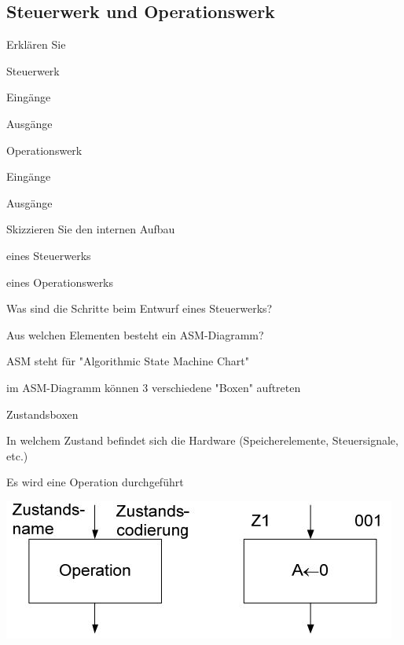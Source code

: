 \documentclass
[
  draft    = true,
  fontsize = 11pt,
  parskip  = half-,
  BCOR     = 0pt,
  DIV      = 11,
  ngerman,
  dvipsnames
]
{scrartcl}
\begin{document}
\subsection*{Steuerwerk und Operationswerk}
\begin{mytemize}
  \item Erklären Sie
        \begin{mytemize}
          \item Steuerwerk
                \begin{mytemize}
                  \item Eingänge
                  \item Ausgänge
                \end{mytemize}
          \item Operationswerk
                \begin{mytemize}
                  \item Eingänge
                  \item Ausgänge
                \end{mytemize}
        \end{mytemize}
  \item Skizzieren Sie den internen Aufbau
        \begin{mytemize}
          \item eines Steuerwerks
          \item eines Operationswerks
        \end{mytemize}
  \item Was sind die Schritte beim Entwurf eines Steuerwerks?
  \item Aus welchen Elementen besteht ein ASM-Diagramm?
	  \begin{karsten}
	  	\begin{mytemize}
	  		\item ASM steht für "Algorithmic State Machine Chart"
	  		\item im ASM-Diagramm können 3 verschiedene "Boxen" auftreten
	  		\begin{mytemize}
	  			\item Zustandsboxen
	  				\begin{mytemize}
	  					\item In welchem Zustand befindet sich die Hardware (Speicherelemente, Steuersignale, etc.)
	  					\item Es wird eine Operation durchgeführt
	  					\item \includegraphics[width=0.8\linewidth]{Zeichnungen/ASM-Zustandsbox}

\end{mytemize}
\end{mytemize}
\end{mytemize}
\end{karsten}
\end{mytemize}
\end{document}
